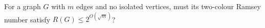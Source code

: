 For a graph $G$ with $m$ edges and no isolated vertices, must its two-colour Ramsey number satisfy $R(G)\leq2^{O(\sqrt m)}$?
